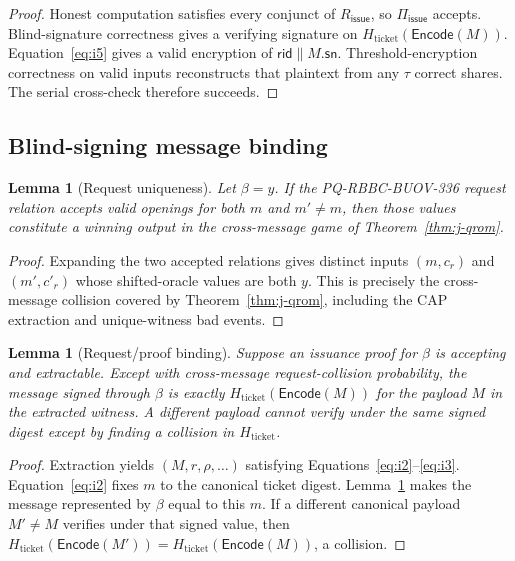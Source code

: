\documentclass[11pt]{article}
\newtheorem{lemma}[definition]{Lemma}
\newcommand{\Piiss}{\Pi_{\mathsf{issue}}}
\newcommand{\rid}{\mathsf{rid}}
\newcommand{\sn}{\mathsf{sn}}
\begin{document}
\begin{proof}
Honest computation satisfies every conjunct of $R_{\mathsf{issue}}$, so
$\Piiss$ accepts.  Blind-signature correctness gives a verifying signature
on $H_{\mathrm{ticket}}(\mathsf{Encode}(M))$.
Equation~\eqref{eq:i5} gives a
valid encryption of $\rid\|M.\sn$.  Threshold-encryption correctness on valid
inputs reconstructs that plaintext from any $\tau$ correct shares.  The serial
cross-check therefore succeeds.
\end{proof}

\subsection{Blind-signing message binding}

\begin{lemma}[Request uniqueness]\label{lem:buov-unique}
Let $\beta=y$.  If the PQ-RBBC-BUOV-336 request relation accepts valid openings
for both $m$ and $m'\neq m$, then those values constitute a winning output in
the cross-message game of Theorem~\ref{thm:j-qrom}.
\end{lemma}

\begin{proof}
Expanding the two accepted relations gives distinct inputs $(m,c_r)$ and
$(m',c'_r)$ whose shifted-oracle values are both $y$.  This is precisely the
cross-message collision covered by Theorem~\ref{thm:j-qrom}, including the CAP
extraction and unique-witness bad events.
\end{proof}

\begin{lemma}[Request/proof binding]\label{lem:reqbind}
Suppose an issuance proof for $\beta$ is accepting and extractable.  Except
with cross-message request-collision probability, the message signed through
$\beta$ is exactly $H_{\mathrm{ticket}}(\mathsf{Encode}(M))$ for the payload
$M$ in the extracted witness.  A different payload cannot verify under the same
signed digest except by finding a collision in $H_{\mathrm{ticket}}$.
\end{lemma}

\begin{proof}
Extraction yields $(M,r,\rho,\ldots)$ satisfying
Equations~\eqref{eq:i2}--\eqref{eq:i3}.  Equation~\eqref{eq:i2} fixes $m$ to the
canonical ticket digest.  Lemma~\ref{lem:buov-unique} makes the message
represented by $\beta$ equal to this $m$.  If a different canonical payload
$M'\neq M$ verifies under that signed value, then
$H_{\mathrm{ticket}}(\mathsf{Encode}(M'))=
H_{\mathrm{ticket}}(\mathsf{Encode}(M))$, a collision.
\end{proof}
\end{document}
